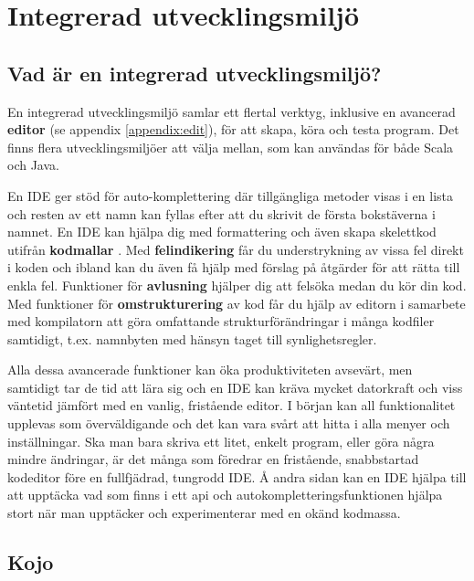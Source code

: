 
\chapter{Integrerad utvecklingsmiljö}\label{appendix:ide}

\section{Vad är en integrerad utvecklingsmiljö?}

En integrerad utvecklingsmiljö  samlar ett flertal verktyg, inklusive en avancerad \textbf{editor} (se appendix \ref{appendix:edit}), för att skapa, köra och testa program. Det finns flera utvecklingsmiljöer att välja mellan, som kan användas för både Scala och Java.

En IDE ger stöd för auto-komplettering  där tillgängliga metoder visas i en lista och resten av ett namn kan fyllas efter att du skrivit de första bokstäverna i namnet. En IDE kan hjälpa dig med formattering och även skapa skelettkod utifrån \textbf{kodmallar} . Med \textbf{felindikering}  får du understrykning av vissa fel direkt i koden och ibland kan du även få hjälp med förslag på åtgärder för att rätta till enkla fel. Funktioner för \textbf{avlusning}  hjälper dig att felsöka medan du kör din kod. Med funktioner för \textbf{omstrukturering}  av kod får du hjälp av editorn i samarbete med kompilatorn att göra omfattande strukturförändringar i många kodfiler samtidigt, t.ex. namnbyten med hänsyn taget till synlighetsregler.  

Alla dessa avancerade funktioner kan öka produktiviteten avsevärt, men samtidigt tar de tid att lära sig och en IDE kan kräva mycket datorkraft och viss väntetid jämfört med en vanlig, fristående editor. I början kan all funktionalitet upplevas som överväldigande och det kan vara svårt att hitta i alla menyer och inställningar. Ska man bara skriva ett litet, enkelt program, eller göra några mindre ändringar, är det många som föredrar en fristående, snabbstartad kodeditor före en fullfjädrad, tungrodd IDE. Å andra sidan kan en IDE hjälpa till att upptäcka vad som finns i ett api och autokompletteringsfunktionen hjälpa stort när man upptäcker och experimenterar med en okänd kodmassa.


\section{Kojo}\label{appendix:kojo}

